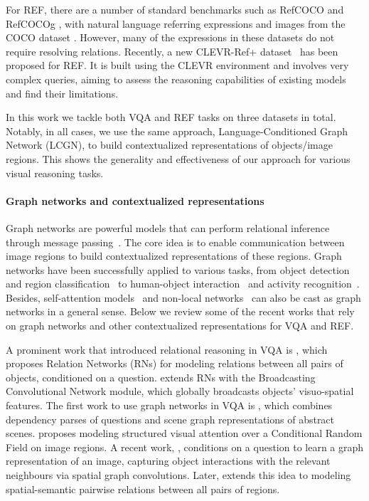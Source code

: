 \documentclass[10pt,twocolumn,letterpaper]{article}
\begin{document}
For REF, there are a number of standard benchmarks such as RefCOCO \cite{yu2016modeling} and RefCOCOg \cite{mao2016generation}, with natural language referring expressions and images from the COCO dataset \cite{lin2014microsoft}. However, many of the expressions in these datasets do not require resolving relations. Recently, a new CLEVR-Ref+ dataset~\cite{liu2019clevr} has been proposed for REF. It is built using the CLEVR environment and involves very complex queries, aiming to assess the reasoning capabilities of existing models and find their limitations.

In this work we tackle both VQA and REF tasks on three datasets in total. Notably, in all cases, we use the same approach, Language-Conditioned Graph Network (LCGN), to build contextualized representations of objects/image regions. This shows the generality and effectiveness of our approach for various visual reasoning tasks.

\vspace{-1em}
\paragraph{Graph networks and contextualized representations}

Graph networks are powerful models that can perform relational inference through message passing~\cite{battaglia2018relational,gilmer2017neural,kipf2016semi,li2016gated,velivckovic2017graph,zhou2018graph}. The core idea is to enable communication between image regions to build contextualized representations of these regions. Graph networks have been successfully applied to various tasks, from object detection~\cite{liu2018structure} and region classification~\cite{chen2018iterative} to human-object interaction~\cite{qi2018learning} and activity recognition~\cite{herzig2018classifying}. Besides, self-attention models~\cite{vaswani2017attention} and non-local networks~\cite{wang2018non} can also be cast as graph networks in a general sense. 
Below we review some of the recent works that rely on graph networks and other contextualized representations for VQA and REF.

A prominent work that introduced relational reasoning in VQA is \cite{santoro2017simple}, which proposes Relation Networks (RNs) for modeling relations between all pairs of objects, conditioned on a question.  \cite{chang2018broadcasting} extends RNs with the Broadcasting Convolutional Network module, which globally broadcasts objects' visuo-spatial features. 
The first work to use graph networks in VQA is \cite{teney2017graph}, which combines dependency parses of questions and scene graph representations of abstract scenes. 
\cite{zhu2017structured} proposes modeling structured visual attention over a Conditional Random Field on image regions.
A recent work, \cite{norcliffe2018learning}, conditions on a question to learn a graph representation of an image, capturing object interactions with the relevant neighbours via spatial graph convolutions. 
Later, \cite{cadene2019murel} extends this idea to modeling spatial-semantic pairwise relations between all pairs of regions.
\end{document}
